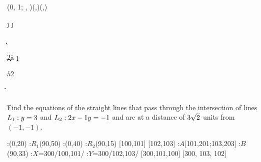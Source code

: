 



\MULTIPLY{}\a
\SOLVELINEARSYSTEM(0, 1; \vb, \vc)(\va,\vd)(\p,\q)

\ADD{}\j
\SQUARE\j\jj

\ADD{}\k
\SQUARE\k\kk

\SQUARE\ve\c
\MULTIPLY\c{2}\d

\SUBTRACT\d\jj\aa
\MULTIPLY\j\k\x
\MULTIPLY{}\bb
\SUBTRACT\d\kk\cc

\gcalcexpr[0]
\MULTIPLY{}\mbb
\MULTIPLY\aa{2}\dnm

\ADD\mbb\disc\f
\SUBTRACT\mbb\disc\g


\question[4] Find the equations of the straight lines that pass
 through the intersection of lines $L_1: y=3$ and 
 $L_2: 2 x -1 y = -1$ and are at a distance of $3\sqrt{2}$
 units from $(-1, -1)$.


\watchout

\ifprintanswers
  \begin{marginfigure}[+40 pt]
      :(0,20)
      :$R_1$(90,50)
      :(0,40)
      :$R_2$(90,15)
      [100,101]
      [102,103]
      :$A$[101,201;103,203] %
      :$B$ (90,33)
      :$X$=300/100,101/
      :$Y$=300/102,103/
    \figdrawbegin{}
      \figdrawline [100,101]
      \figdrawline [102,103]
       [300,101,100]
       [300, 103, 102]
    \figdrawend
    \centerline{\box\figBoxA}
  \end{marginfigure}
\fi 


